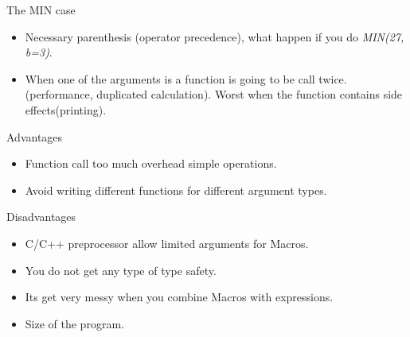 


\begin{frame}{The MIN case}
    \begin{itemize}\addtolength{\itemsep}{2\baselineskip}
        \item Necessary parenthesis (operator precedence), what happen if you 
            do \emph{MIN(27, b=3)}.

        \item When one of the arguments is a function is going to be call twice. 
            (performance, duplicated calculation). Worst when the function
            contains side effects(printing).
    \end{itemize}
\end{frame}

\begin{frame}{Advantages}
    \begin{itemize}\addtolength{\itemsep}{1\baselineskip}
        \item Function call too much overhead simple operations.

        
        \item Avoid writing different functions for different argument types.
    \end{itemize}
\end{frame}

\begin{frame}{Disadvantages}
    \begin{itemize}\addtolength{\itemsep}{1\baselineskip}
        \item C/C++ preprocessor allow limited arguments for Macros.

        \item You do not get any type of type safety.

        \item Its get very messy when you combine Macros with expressions.

        \item Size of the program.
    \end{itemize}
\end{frame}

